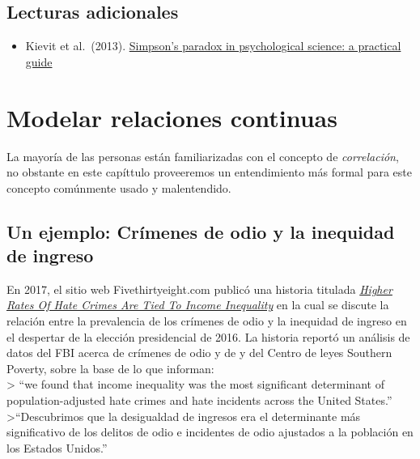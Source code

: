 \documentclass[
  12pt,
]{book}
\providecommand{\tightlist}{%
  \setlength{\itemsep}{0pt}\setlength{\parskip}{0pt}}
\theoremstyle{definition}
\theoremstyle{definition}
\theoremstyle{definition}
\theoremstyle{remark}
\begin{document}
\hypertarget{lecturas-adicionales}{%
\section{Lecturas adicionales}\label{lecturas-adicionales}}

\begin{itemize}
\tightlist
\item
  Kievit et al.~(2013). \href{https://www.frontiersin.org/articles/10.3389/fpsyg.2013.00513/full}{Simpson's paradox in psychological science: a practical guide}
\end{itemize}

\hypertarget{modelar-relaciones-continuas}{%
\chapter{Modelar relaciones continuas}\label{modelar-relaciones-continuas}}

La mayoría de las personas están familiarizadas con el concepto de \emph{correlación}, no obstante en este capíttulo proveeremos un entendimiento más formal para este concepto comúnmente usado y malentendido.

\hypertarget{un-ejemplo-cruxedmenes-de-odio-y-la-inequidad-de-ingreso}{%
\section{Un ejemplo: Crímenes de odio y la inequidad de ingreso}\label{un-ejemplo-cruxedmenes-de-odio-y-la-inequidad-de-ingreso}}

En 2017, el sitio web Fivethirtyeight.com publicó una historia titulada \href{https://fivethirtyeight.com/features/higher-rates-of-hate-crimes-are-tied-to-income-inequality/}{\emph{Higher Rates Of Hate Crimes Are Tied To Income Inequality}} en la cual se discute la relación entre la prevalencia de los crímenes de odio y la inequidad de ingreso en el despertar de la elección presidencial de 2016. La historia reportó un análisis de datos del FBI acerca de crímenes de odio y de y del Centro de leyes Southern Poverty, sobre la base de lo que informan:\\
\textgreater{} ``we found that income inequality was the most significant determinant of population-adjusted hate crimes and hate incidents across the United States.''\\
\textgreater{}``Descubrimos que la desigualdad de ingresos era el determinante más significativo de los delitos de odio e incidentes de odio ajustados a la población en los Estados Unidos.''
\end{document}
